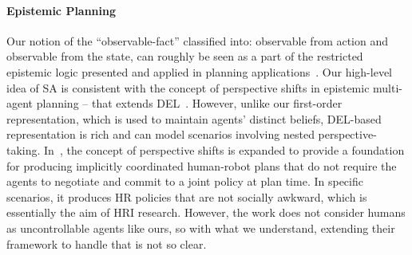 \documentclass[letterpaper]{article} %
\begin{document}
\paragraph{Epistemic Planning}
Our notion of the ``observable-fact'' classified into: observable from action and observable from the state, can roughly be seen as a part of the restricted epistemic logic presented and applied in planning applications~\cite{CooperHMMPR21}. 
Our high-level idea of SA is consistent with the concept of perspective shifts in epistemic multi-agent planning -- that extends DEL~\cite{engesser2017cooperative}. 
However, unlike our first-order representation, which is used to maintain agents' distinct beliefs, DEL-based representation is rich and can model scenarios involving nested perspective-taking.  
In~\cite{KR2021-12}, the concept of perspective shifts is expanded to provide a foundation for producing implicitly coordinated human-robot plans that do not require the agents to negotiate and commit to a joint policy at plan time. 
In specific scenarios, it produces HR policies that are not socially awkward, which is essentially the aim of HRI research. 
However, the work does not consider humans as uncontrollable agents like ours, so with what we understand, extending their framework to handle that is not so clear.  










\end{document}
